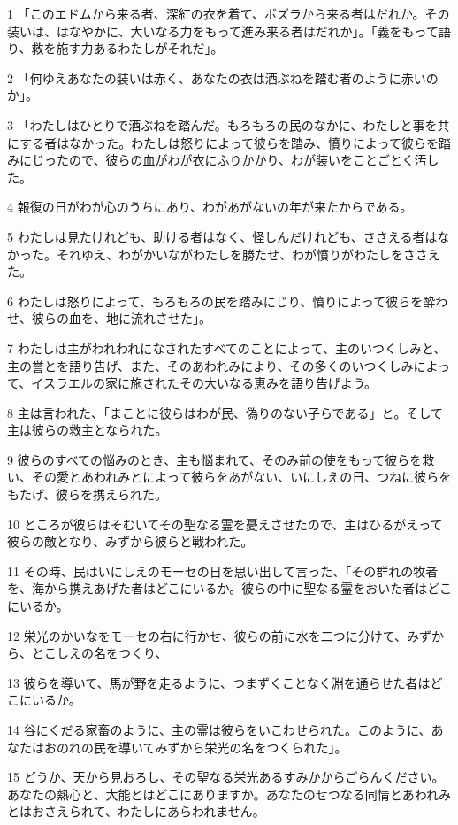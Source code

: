 \par 1 「このエドムから来る者、深紅の衣を着て、ボズラから来る者はだれか。その装いは、はなやかに、大いなる力をもって進み来る者はだれか」。「義をもって語り、救を施す力あるわたしがそれだ」。
\par 2 「何ゆえあなたの装いは赤く、あなたの衣は酒ぶねを踏む者のように赤いのか」。
\par 3 「わたしはひとりで酒ぶねを踏んだ。もろもろの民のなかに、わたしと事を共にする者はなかった。わたしは怒りによって彼らを踏み、憤りによって彼らを踏みにじったので、彼らの血がわが衣にふりかかり、わが装いをことごとく汚した。
\par 4 報復の日がわが心のうちにあり、わがあがないの年が来たからである。
\par 5 わたしは見たけれども、助ける者はなく、怪しんだけれども、ささえる者はなかった。それゆえ、わがかいながわたしを勝たせ、わが憤りがわたしをささえた。
\par 6 わたしは怒りによって、もろもろの民を踏みにじり、憤りによって彼らを酔わせ、彼らの血を、地に流れさせた」。
\par 7 わたしは主がわれわれになされたすべてのことによって、主のいつくしみと、主の誉とを語り告げ、また、そのあわれみにより、その多くのいつくしみによって、イスラエルの家に施されたその大いなる恵みを語り告げよう。
\par 8 主は言われた、「まことに彼らはわが民、偽りのない子らである」と。そして主は彼らの救主となられた。
\par 9 彼らのすべての悩みのとき、主も悩まれて、そのみ前の使をもって彼らを救い、その愛とあわれみとによって彼らをあがない、いにしえの日、つねに彼らをもたげ、彼らを携えられた。
\par 10 ところが彼らはそむいてその聖なる霊を憂えさせたので、主はひるがえって彼らの敵となり、みずから彼らと戦われた。
\par 11 その時、民はいにしえのモーセの日を思い出して言った、「その群れの牧者を、海から携えあげた者はどこにいるか。彼らの中に聖なる霊をおいた者はどこにいるか。
\par 12 栄光のかいなをモーセの右に行かせ、彼らの前に水を二つに分けて、みずから、とこしえの名をつくり、
\par 13 彼らを導いて、馬が野を走るように、つまずくことなく淵を通らせた者はどこにいるか。
\par 14 谷にくだる家畜のように、主の霊は彼らをいこわせられた。このように、あなたはおのれの民を導いてみずから栄光の名をつくられた」。
\par 15 どうか、天から見おろし、その聖なる栄光あるすみかからごらんください。あなたの熱心と、大能とはどこにありますか。あなたのせつなる同情とあわれみとはおさえられて、わたしにあらわれません。

